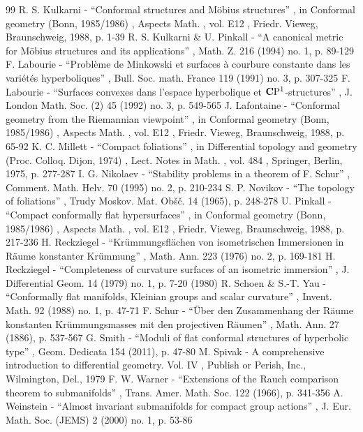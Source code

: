 \begin{thebibliography}{99}
 R. S. Kulkarni - “Conformal structures and Möbius structures” , in Conformal geometry (Bonn, 1985/1986) , Aspects Math. , vol. E12 , Friedr. Vieweg, Braunschweig, 1988, p. 1-39
 R. S. Kulkarni \& U. Pinkall - “A canonical metric for Möbius structures and its applications” , Math. Z. 216 (1994) no. 1, p. 89-129
 F. Labourie - “Problème de Minkowski et surfaces à courbure constante dans les variétés hyperboliques” , Bull. Soc. math. France 119 (1991) no. 3, p. 307-325
 F. Labourie - “Surfaces convexes dans l’espace hyperbolique et ${\bf C}{\rm P}^1$-structures” , J. London Math. Soc. (2) 45 (1992) no. 3, p. 549-565
 J. Lafontaine - “Conformal geometry from the Riemannian viewpoint” , in Conformal geometry (Bonn, 1985/1986) , Aspects Math. , vol. E12 , Friedr. Vieweg, Braunschweig, 1988, p. 65-92
 K. C. Millett - “Compact foliations” , in Differential topology and geometry (Proc. Colloq. Dijon, 1974) , Lect. Notes in Math. , vol. 484 , Springer, Berlin, 1975, p. 277-287
 I. G. Nikolaev - “Stability problems in a theorem of F. Schur” , Comment. Math. Helv. 70 (1995) no. 2, p. 210-234
 S. P. Novikov - “The topology of foliations” , Trudy Moskov. Mat. Obšč. 14 (1965), p. 248-278
 U. Pinkall - “Compact conformally flat hypersurfaces” , in Conformal geometry (Bonn, 1985/1986) , Aspects Math. , vol. E12 , Friedr. Vieweg, Braunschweig, 1988, p. 217-236
 H. Reckziegel - “Krümmungsflächen von isometrischen Immersionen in Räume konstanter Krümmung” , Math. Ann. 223 (1976) no. 2, p. 169-181
 H. Reckziegel - “Completeness of curvature surfaces of an isometric immersion” , J. Differential Geom. 14 (1979) no. 1, p. 7-20 (1980)
 R. Schoen \& S.-T. Yau - “Conformally flat manifolds, Kleinian groups and scalar curvature” , Invent. Math. 92 (1988) no. 1, p. 47-71
 F. Schur - “Über den Zusammenhang der Räume konstanten Krümmungsmasses mit den projectiven Räumen” , Math. Ann. 27 (1886), p. 537-567
 G. Smith - “Moduli of flat conformal structures of hyperbolic type” , Geom. Dedicata 154 (2011), p. 47-80
 M. Spivak - A comprehensive introduction to differential geometry. Vol. IV , Publish or Perish, Inc., Wilmington, Del., 1979
 F. W. Warner - “Extensions of the Rauch comparison theorem to submanifolds” , Trans. Amer. Math. Soc. 122 (1966), p. 341-356
 A. Weinstein - “Almost invariant submanifolds for compact group actions” , J. Eur. Math. Soc. (JEMS) 2 (2000) no. 1, p. 53-86
\end{thebibliography}
